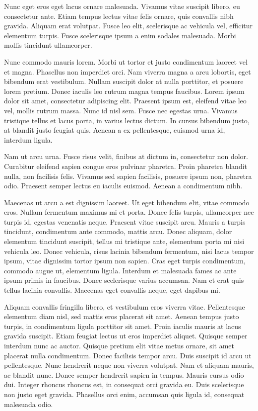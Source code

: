 \documentclass[a4paper,twoside=false,12pt,spanish,DIV=7]{scrbook}
\begin{document}
Nunc eget eros eget lacus ornare malesuada. Vivamus vitae suscipit libero, eu consectetur ante. Etiam tempus lectus vitae felis ornare, quis convallis nibh gravida. Aliquam erat volutpat. Fusce leo elit, scelerisque ac vehicula vel, efficitur elementum turpis. Fusce scelerisque ipsum a enim sodales malesuada. Morbi mollis tincidunt ullamcorper.

Nunc commodo mauris lorem. Morbi ut tortor et justo condimentum laoreet vel et magna. Phasellus non imperdiet orci. Nam viverra magna a arcu lobortis, eget bibendum erat vestibulum. Nullam suscipit dolor at nulla porttitor, et posuere lorem pretium. Donec iaculis leo rutrum magna tempus faucibus. Lorem ipsum dolor sit amet, consectetur adipiscing elit. Praesent ipsum est, eleifend vitae leo vel, mollis rutrum massa. Nunc id nisl sem. Fusce nec egestas urna. Vivamus tristique tellus et lacus porta, in varius lectus dictum. In cursus bibendum justo, at blandit justo feugiat quis. Aenean a ex pellentesque, euismod urna id, interdum ligula.

Nam ut arcu urna. Fusce risus velit, finibus at dictum in, consectetur non dolor. Curabitur eleifend sapien congue eros pulvinar pharetra. Proin pharetra blandit nulla, non facilisis felis. Vivamus sed sapien facilisis, posuere ipsum non, pharetra odio. Praesent semper lectus eu iaculis euismod. Aenean a condimentum nibh.

Maecenas ut arcu a est dignissim laoreet. Ut eget bibendum elit, vitae commodo eros. Nullam fermentum maximus mi et porta. Donec felis turpis, ullamcorper nec turpis id, egestas venenatis neque. Praesent vitae suscipit arcu. Mauris a turpis tincidunt, condimentum ante commodo, mattis arcu. Donec aliquam, dolor elementum tincidunt suscipit, tellus mi tristique ante, elementum porta mi nisi vehicula leo. Donec vehicula, risus lacinia bibendum fermentum, nisi lacus tempor ipsum, vitae dignissim tortor ipsum non sapien. Cras eget turpis condimentum, commodo augue ut, elementum ligula. Interdum et malesuada fames ac ante ipsum primis in faucibus. Donec scelerisque varius accumsan. Nam et erat quis tellus lacinia convallis. Maecenas eget convallis neque, eget dapibus mi.

Aliquam convallis fringilla libero, et vestibulum eros viverra vitae. Pellentesque elementum diam nisl, sed mattis eros placerat sit amet. Aenean tempus justo turpis, in condimentum ligula porttitor sit amet. Proin iaculis mauris at lacus gravida suscipit. Etiam feugiat lectus ut eros imperdiet aliquet. Quisque semper interdum nunc ac auctor. Quisque pretium elit vitae metus ornare, sit amet placerat nulla condimentum. Donec facilisis tempor arcu. Duis suscipit id arcu ut pellentesque. Nunc hendrerit neque non viverra volutpat. Nam et aliquam mauris, ac blandit nunc. Donec semper hendrerit sapien in tempus. Mauris cursus odio dui. Integer rhoncus rhoncus est, in consequat orci gravida eu. Duis scelerisque non justo eget gravida. Phasellus orci enim, accumsan quis ligula id, consequat malesuada odio.
\end{document}
